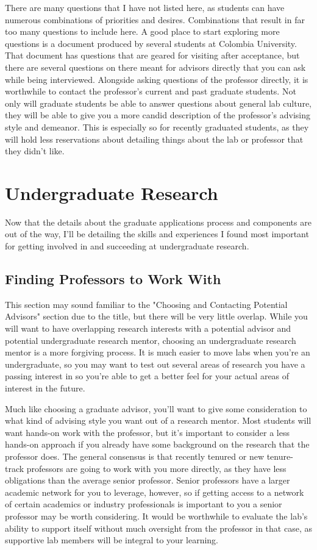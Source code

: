 \documentclass[12pt]{article}
\begin{document}
There are many questions that I have not listed here, as students can have numerous combinations of priorities and desires. Combinations that result in far too many questions to include here. A good place to start exploring more questions is a document produced by several students at Colombia University. \cite{colombiaquestions} That document has questions that are geared for visiting after acceptance, but there are several questions on there meant for advisors directly that you can ask while being interviewed. Alongside asking questions of the professor directly, it is worthwhile to contact the professor's current and past graduate students. Not only will graduate students be able to answer questions about general lab culture, they will be able to give you a more candid description of the professor's advising style and demeanor. This is especially so for recently graduated students, as they will hold less reservations about detailing things about the lab or professor that they didn't like.

\section{Undergraduate Research}

Now that the details about the graduate applications process and components are out of the way, I'll be detailing the skills and experiences I found most important for getting involved in and succeeding at undergraduate research.

\subsection{Finding Professors to Work With}

This section may sound familiar to the "Choosing and Contacting Potential Advisors" section due to the title, but there will be very little overlap. While you will want to have overlapping research interests with a potential advisor and potential undergraduate research mentor, choosing an undergraduate research mentor is a more forgiving process. It is much easier to move labs when you're an undergraduate, so you may want to test out several areas of research you have a passing interest in so you're able to get a better feel for your actual areas of interest in the future. 

Much like choosing a graduate advisor, you'll want to give some consideration to what kind of advising style you want out of a research mentor. Most students will want hands-on work with the professor, but it's important to consider a less hands-on approach if you already have some background on the research that the professor does. The general consensus is that recently tenured or new tenure-track professors are going to work with you more directly, as they have less obligations than the average senior professor. Senior professors have a larger academic network for you to leverage, however, so if getting access to a network of certain academics or industry professionals is important to you a senior professor may be worth considering. It would be worthwhile to evaluate the lab's ability to support itself without much oversight from the professor in that case, as supportive lab members will be integral to your learning.
\end{document}
